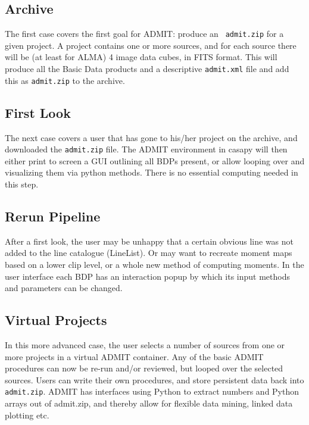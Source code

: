 \documentclass{article}
\begin{document}
\subsection{Archive}

The first case covers the first goal for ADMIT: produce an {\tt
  admit.zip} for a given project.  A project contains one or more
sources, and for each source there will be (at least for ALMA) 4 image
data cubes, in FITS format. This will produce all the Basic Data
products and a descriptive {\tt admit.xml} file and add this as 
{\tt admit.zip} to the archive.



\subsection{First Look}

The next case covers a user that has gone to his/her project on the archive,
and downloaded the {\tt admit.zip} file. The ADMIT environment in casapy
will then either print to screen a GUI outlining all BDPs present, or
allow looping over and visualizing them via python methods. There is no
essential computing needed in this step.

\subsection{Rerun Pipeline}

After a first look, the user may be unhappy that a certain obvious line
was not added to the line catalogue (LineList). Or may want to recreate
moment maps based on a lower clip level, or a whole new method of
computing moments. In the user interface each BDP has an
interaction popup by which its input methods and parameters can be changed.

\subsection{Virtual Projects}

In this more advanced case, the user selects a number of sources from one
or more projects in a virtual ADMIT container. Any of the basic ADMIT procedures
can now be re-run and/or reviewed, but looped over the selected sources.
Users can write their own procedures,
and store persistent data back into {\tt admit.zip}. ADMIT has interfaces
using Python to extract numbers and Python arrays out of admit.zip, and thereby
allow for flexible data mining, linked data plotting etc.
\end{document}
